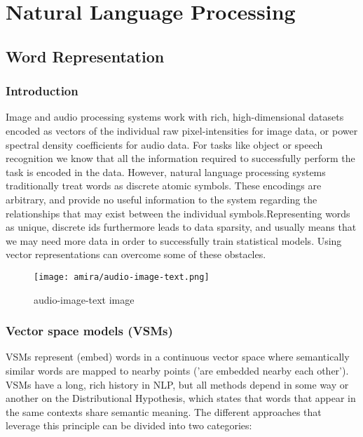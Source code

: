 \chapter{Natural Language Processing}%
\label{chap:chap3}

\section{Word Representation}
\label{section:chap3:sec1}

  \subsection{Introduction}

Image and audio processing systems work with rich, high-dimensional datasets encoded as vectors of the individual raw pixel-intensities for image data, or power spectral density coefficients for audio data. For tasks like object or speech recognition we know that all the information required to successfully perform the task is encoded in the data. However, natural language processing systems traditionally treat words as discrete atomic symbols. These encodings are arbitrary, and provide no useful information to the system regarding the relationships that may exist between the individual symbols.Representing words as unique, discrete ids furthermore leads to data sparsity, and usually means that we may need more data in order to successfully train statistical models. Using vector representations can overcome some of these obstacles\cite{web003}\@.
  
 \begin{figure}[H]%
    \center%
    \texttt{[image: amira/audio-image-text.png]}%
    \caption[This is audio-image-text image]{audio-image-text image}\label{fig:audio-image-text}%
 \end{figure}
 
\subsection{Vector space models (VSMs)}
    VSMs represent (embed) words in a continuous vector space where semantically similar words are mapped to nearby points ('are embedded nearby each other').
    VSMs have a long, rich history in NLP, but all methods depend in some way or another on the Distributional Hypothesis, which states that words that appear in the same contexts share semantic meaning. The different approaches that leverage this principle can be divided into two categories:
  
